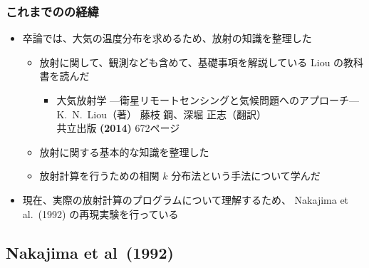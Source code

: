 \documentclass[aspectratio=149]{beamer}
\begin{document}
\begin{frame}
	\frametitle{これまでのの経緯}
	\begin{itemize}
		\item 卒論では、大気の温度分布を求めるため、放射の知識を整理した
			\begin{itemize}
				\item 放射に関して、観測なども含めて、基礎事項を解説している
					Liou の教科書を読んだ
					\begin{itemize}
						\item 大気放射学 {\scriptsize---衛星リモートセンシングと気候問題へのアプローチ---}\\
							K.~N.~Liou（著） 藤枝 鋼、深堀 正志（翻訳）\\
							共立出版 \textbf{(2014)} 672ページ
					\end{itemize}
				\item 放射に関する基本的な知識を整理した
				\item 放射計算を行うための相関 \(k\) 分布法という手法について学んだ
			\end{itemize}
		\item 現在、実際の放射計算のプログラムについて理解するため、
			Nakajima et al.\ (1992) の再現実験を行っている
	\end{itemize}
\end{frame}

\begin{frame}
	\section{Nakajima et al\ (1992)}
	
\end{frame}
\end{document}
